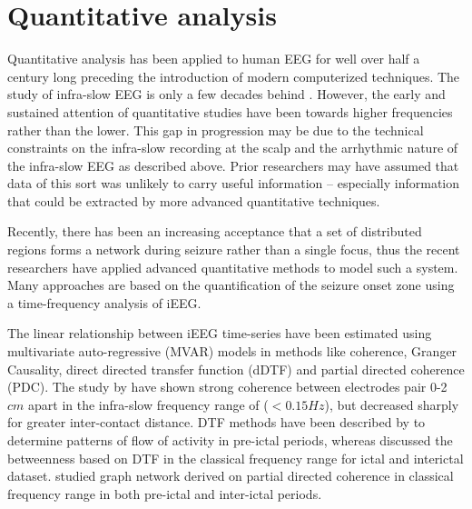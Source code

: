 


\section{Quantitative analysis}
Quantitative analysis has been applied to human EEG for well over half a century \citep{grass1938fourier} long preceding the introduction of modern computerized techniques. The study of infra-slow EEG is only a few decades behind \citep{aladjalova1957infra}. However, the early and sustained attention of quantitative studies have been towards higher frequencies rather than the lower. This gap in progression may be due to the technical constraints on the infra-slow recording at the scalp and the arrhythmic nature of the infra-slow EEG as described above. Prior researchers may have assumed that data of this sort was unlikely to carry useful information – especially information that could be extracted by more advanced quantitative techniques.

Recently, there has been an increasing acceptance that a set of distributed regions forms a network during seizure rather than a single focus, thus the recent researchers have applied advanced quantitative methods to model such a system. Many approaches are based on the quantification of the seizure onset zone using a time-frequency analysis of iEEG. 


The linear relationship between iEEG time-series have been estimated using multivariate auto-regressive (MVAR) models in methods like coherence, Granger Causality, direct directed transfer function (dDTF) and partial directed coherence (PDC). The study by \citep{joshi2016regional} have shown strong coherence between electrodes pair 0-2 $cm$  apart in the infra-slow frequency range of ($<0.15 Hz$), but decreased sharply for greater inter-contact distance. DTF methods have been described by \citep{franaszczuk1998application} to determine patterns of flow of activity in pre-ictal periods, whereas \citep{wilke2011graph} discussed the betweenness based on DTF in the classical frequency range for ictal and interictal dataset. \citep{zhang2020establishing} studied graph network derived on partial directed coherence in classical frequency range in both pre-ictal and inter-ictal periods.

